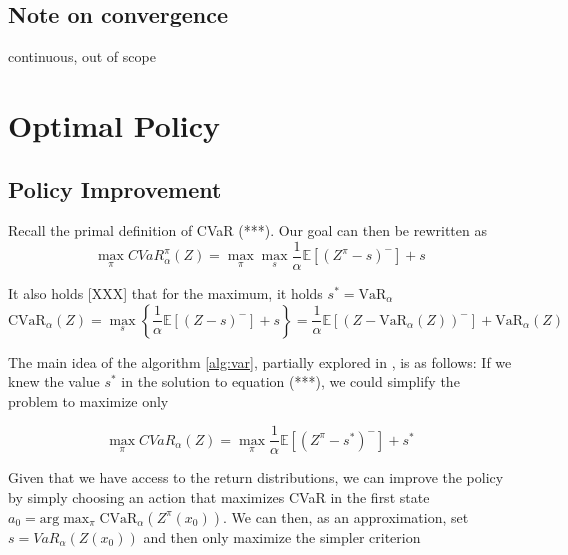 \subsection{Note on convergence}
continuous, out of scope



\section{Optimal Policy}\label{sec:qpolicy}
\subsection{Policy Improvement}
Recall the primal definition of CVaR (***).
Our goal can then be rewritten as
\begin{equation}\label{eq:goal}
\max_\pi CVaR_\alpha^\pi(Z) = \max_\pi \max_s \dfrac{1}{\alpha}\mathbb{E}
\left[ (Z^\pi-s)^-\right] + s
\end{equation}


It also holds [XXX] that for the maximum, it holds $s^*=\text{VaR}_\alpha$
\begin{equation}
\text{CVaR}_\alpha(Z)=
\max_s\left\lbrace \dfrac{1}{\alpha}\mathbb{E}
\left[ (Z-s)^-\right] + s  \right\rbrace =\dfrac{1}{\alpha}\mathbb{E}
\left[ (Z - \text{VaR}_\alpha(Z))^-\right] + \text{VaR}_\alpha(Z) 
\end{equation}


The main idea of the algorithm \ref{alg:var}, partially explored in \cite{bauerle2011markov}, is as follows: If we knew the value $s^*$ in the solution to equation (***), we could simplify the problem to maximize only

\begin{equation}\label{eq:goal}
\max_\pi CVaR_\alpha(Z) = \max_\pi \dfrac{1}{\alpha}\mathbb{E}
\left[ (Z^\pi-s^*)^-\right] + s^*
\end{equation}

Given that we have access to the return distributions, we can improve the policy by simply choosing an action that maximizes CVaR in the first state $a_0 = \text{arg}\max_\pi\text{CVaR}_\alpha(Z^\pi(x_0))$. We can then, as an approximation, set $s= VaR_\alpha(Z(x_0))$ and then only maximize the simpler criterion


